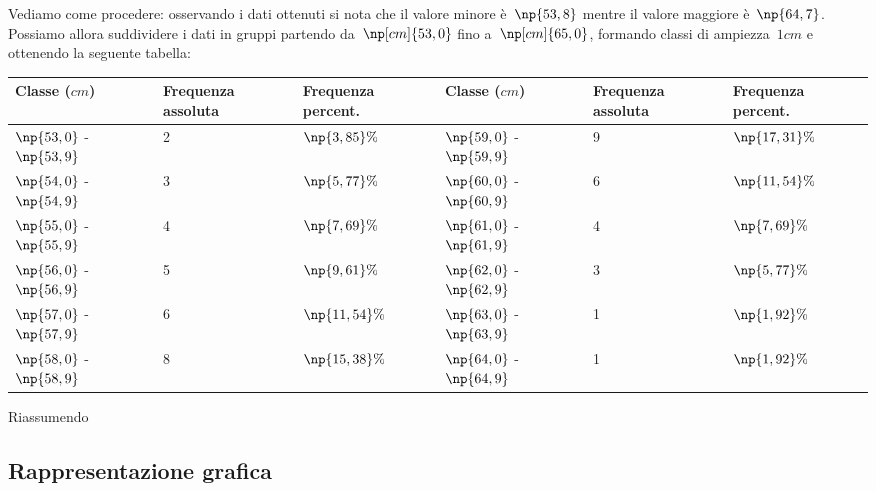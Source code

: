 \begin{exrig}
\begin{esempio}
Vediamo come procedere: osservando i dati ottenuti si nota che il valore minore è~$\np{53,8}$ mentre il valore maggiore è~$\np{64,7}$. Possiamo allora suddividere
i dati in gruppi partendo da~$\np[cm]{53,0}$ fino a~$\np[cm]{65,0}$, formando classi di ampiezza~$1 \unit{cm}$ e ottenendo la seguente tabella:

\begin{center}
\begin{tabularx}{.9\textwidth}{*{2}{lXX}}
\toprule
Classe ($\unit{cm}$) & Frequenza assoluta & Frequenza percent. &Classe ($\unit{cm}$) & Frequenza assoluta & Frequenza percent. \\
\midrule
$\np{53,0}$ - $\np{53,9}$ & 2 & $\np{3,85}\%$ & $\np{59,0}$ - $\np{59,9}$ & 9 & $\np{17,31}\%$\\
$\np{54,0}$ - $\np{54,9}$ & 3 & $\np{5,77}\%$ & $\np{60,0}$ - $\np{60,9}$ & 6 & $\np{11,54}\%$\\
$\np{55,0}$ - $\np{55,9}$ & 4 & $\np{7,69}\%$ & $\np{61,0}$ - $\np{61,9}$ & 4 & $\np{7,69}\%$\\
$\np{56,0}$ - $\np{56,9}$ & 5 & $\np{9,61}\%$ & $\np{62,0}$ - $\np{62,9}$ & 3 & $\np{5,77}\%$\\
$\np{57,0}$ - $\np{57,9}$ & 6 & $\np{11,54}\%$ & $\np{63,0}$ - $\np{63,9}$ & 1 & $\np{1,92}\%$\\
$\np{58,0}$ - $\np{58,9}$ & 8 & $\np{15,38}\%$ & $\np{64,0}$ - $\np{64,9}$ & 1 & $\np{1,92}\%$\\
\end{tabularx}
\end{center}


\end{esempio}
\end{exrig}

\newpage
Riassumendo
\begin{center}
 
\end{center}

\ovalbox{\risolvii \ref{ese:A.2}, \ref{ese:A.3}, \ref{ese:A.5}, \ref{ese:A.6}, \ref{ese:A.7}, \ref{ese:A.8}, \ref{ese:A.9}}

\subsection{Rappresentazione grafica}

